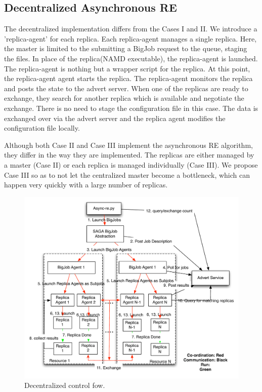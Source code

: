 \documentclass[a4paper,10pt]{article}
\begin{document}
\subsection{Decentralized Asynchronous RE}

The decentralized implementation differs from the Cases I and II. We introduce a 'replica-agent' for each replica. Each replica-agent manages a single replica. Here, the master is limited to the submitting a BigJob request to the queue, staging the files. In place of the replica(NAMD executable), the replica-agent is launched. The replica-agent is nothing but a wrapper script for the replica. At this point, the replica-agent agent starts the replica. The replica-agent monitors the replica and posts the state to the advert server. When one of the replicas are ready to exchange, they search for another replica which is available and negotiate the exchange. There is no need to stage the configuration file in this case. The data is exchanged over via the advert server and the replica agent modifies the configuration file locally.

Although both Case II and Case III implement the asynchronous RE algorithm, they differ in the way they are implemented. The replicas are either managed by a master (Case II) or each replica is managed individually (Case III). We propose Case III so as to not let the centralized master become a bottleneck, which can happen very quickly with a large number of replicas.

\begin{figure}
\centering
\includegraphics[width=1\textwidth]{figures/dec_control.pdf}
\caption{\small Decentralized control fow.}
\label{fig:async}
\end{figure}
\end{document}
